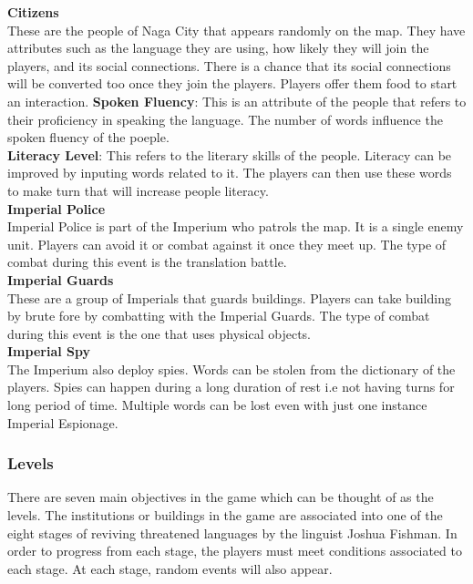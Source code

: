 \documentclass[11pt]{article}
\begin{document}
\textbf{Citizens}\\
These are the people of Naga City that appears randomly on the map. They have attributes such as the language they are using, how likely they will join the players, and its social connections. There is a chance that its social connections will be converted too once they join the players. Players offer them food to start an interaction.
\textbf{Spoken Fluency}: This is an attribute of the people that refers to their proficiency in speaking the language. The number of words influence the spoken fluency of the poeple.\\
\textbf{Literacy Level}: This refers to the literary skills of the people. Literacy can be improved by inputing words related to it. The players can then use these words to make turn that will increase people literacy.\\

\textbf{Imperial Police}\\
Imperial Police is part of the Imperium who patrols the map. It is a single enemy unit. Players can avoid it or combat against it once they meet up. The type of combat during this event is the translation battle.\\

\textbf{Imperial Guards}\\
These are a group of Imperials that guards buildings. Players can take building by brute fore by combatting with the Imperial Guards. The type of combat during this event is the one that uses physical objects.\\

\textbf{Imperial Spy}\\
The Imperium also deploy spies. Words can be stolen from the dictionary of the players. Spies can happen during a long duration of rest i.e not having turns for long period of time. Multiple words can be lost even with just one instance Imperial Espionage.\\


\subsubsection{Levels}
There are seven main objectives in the game which can be thought of as the levels. The institutions or buildings in the game are associated into one of the eight stages of reviving threatened languages by the linguist Joshua Fishman. In order to progress from each stage, the players must meet conditions associated to each stage. At each stage, random events will also appear.\\
\end{document}
